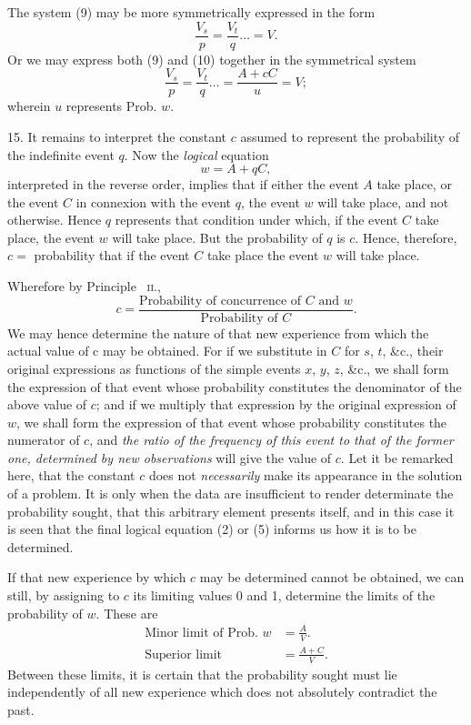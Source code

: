 \documentclass[oneside]{book}
\begin{document}
The system (9) may be more symmetrically expressed in the
form
\[
  \frac{V_s}{p} = \frac{V_t}{q} \dotso = V.     \tag{11}
\]
Or we may express both (9) and (10) together in the symmetrical system
\[
  \frac{V_s}{p} = \frac{V_t}{q} \dotso = \frac{A+cC}{u} = V; \tag{12}
\]
wherein $u$ represents Prob. $w$.

15. It remains to interpret the constant $c$ assumed to represent the probability of the indefinite event $q$. Now the \emph{logical}
equation
\[
  w = A + qC,
\]
interpreted in the reverse order, implies that if either the event
$A$ take place, or the event $C$ in connexion with the event $q$, the
event $w$ will take place, and not otherwise. Hence $q$ represents
that condition under which, if the event $C$ take place, the event
$w$ will take place. But the probability of $q$ is $c$. Hence, therefore, $c =$ probability that if the event $C$ take place the event $w$
will take place.

Wherefore by Principle ~\textsc{ii.},
\[
  c = \frac{ \text{Probability of concurrence of $C$ and $w$} }
           { \text{Probability of $C$} }.
\]
We may hence determine the nature of that new experience
from which the actual value of c may be obtained. For if we
substitute in $C$ for $s$, $t$, \&c., their original expressions as functions
of the simple events $x$, $y$, $z$, \&c., we shall form the expression
of that event whose probability constitutes the denominator
of the above value of $c$; and if we multiply that expression
by the original expression of $w$, we shall form the expression of
that event whose probability constitutes the numerator of $c$, and
\emph{the ratio of the frequency of this event to that of the former one, determined
by new observations} will give the value of $c$. Let it be
remarked here, that the constant $c$ does not \emph{necessarily} make its
appearance in the solution of a problem. It is only when the
data are insufficient to render determinate the probability sought,
that this arbitrary element presents itself, and in this case it is
seen that the final logical equation (2) or (5) informs us how it
is to be determined.

If that new experience by which $c$ may be determined cannot
be obtained, we can still, by assigning to $c$ its limiting values
0 and 1, determine the limits of the probability of $w$. These
are
\[
\begin{array}{ll}
  \textrm{Minor limit of Prob. } w &= \frac{A}{V}.   \\
  \textrm{Superior limit }         &= \frac{A+C}{V}.
\end{array}
\]
Between these limits, it is certain that the probability sought
must lie independently of all new experience which does not absolutely contradict the past.
\end{document}
